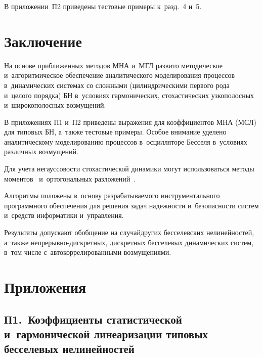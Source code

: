 \begin{multicols}{2}
В приложении~П2 приведены тестовые примеры к~разд.~4 и~5.

\vspace*{-6pt}

\section{Заключение}

\vspace*{-2pt}

На основе приближенных методов МНА и~МГЛ 
развито методическое и~алгоритмическое обеспечение 
аналитического моделирования процессов в~динамических системах со сложными 
 (цилиндрическими первого рода и~целого порядка) БН
в~условиях гармонических, стохастических узкополосных и~широкополосных возмущений.

В приложениях П1 и~П2 приведены выражения для коэффициентов МНА (МСЛ) 
для типовых БН, а~также тестовые примеры. Особое 
внимание уделено аналитическому моделированию процессов в~осцилляторе Бесселя 
в~условиях различных возмущений.

Для учета негауссовости стохастической динамики могут использоваться методы 
моментов~\cite{9-sin, 10-sin, 13-sin} и~ортогональных разложений~\cite{9-sin, 10-sin, 14-sin, 15-sin}.

Алгоритмы положены в~основу разрабатываемого инструментального программного 
обеспечения для решения задач надежности и~безопасности сис\-тем и~средств 
информатики и~управ\-ления.

Результаты допускают обобщение на случай\linebreak других бесселевских нелинейностей, 
а~также не\-пре\-рыв\-но-дис\-крет\-ных, дискретных бесселевых ди\-на\-ми\-ческих сис\-тем, 
в~том числе с~автокоррелированными возмущениями.

\vspace*{-12pt}

{\small
\section*{\raggedleft Приложения}



\subsection*{П1.\ Коэффициенты статистической \hphantom{1.\ }и~гармонической 
линеаризации \hphantom{1.\ }типовых 
бесселевых нелинейностей}


}
\end{multicols}
